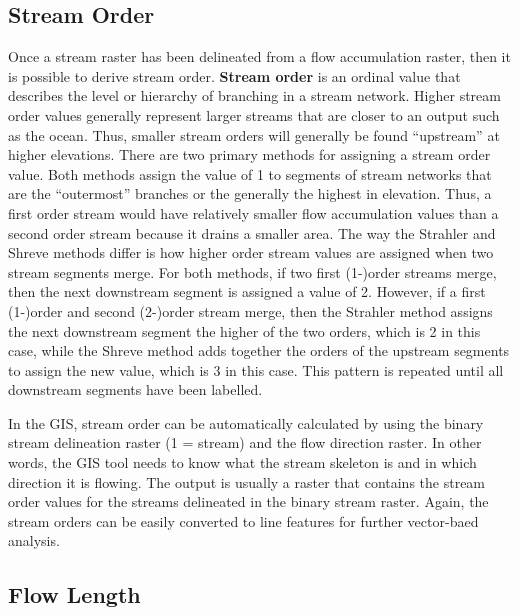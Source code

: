\documentclass[
]{book}
\begin{document}
\subsection{Stream Order}\label{stream-order}

Once a stream raster has been delineated from a flow accumulation raster, then it is possible to derive stream order. \textbf{Stream order} is an ordinal value that describes the level or hierarchy of branching in a stream network. Higher stream order values generally represent larger streams that are closer to an output such as the ocean. Thus, smaller stream orders will generally be found ``upstream'' at higher elevations. There are two primary methods for assigning a stream order value. Both methods assign the value of 1 to segments of stream networks that are the ``outermost'' branches or the generally the highest in elevation. Thus, a first order stream would have relatively smaller flow accumulation values than a second order stream because it drains a smaller area. The way the Strahler \citep{strahler_quantitative_1957} and Shreve \citep{shreve_statistical_1966} methods differ is how higher order stream values are assigned when two stream segments merge. For both methods, if two first (1-)order streams merge, then the next downstream segment is assigned a value of 2. However, if a first (1-)order and second (2-)order stream merge, then the Strahler method assigns the next downstream segment the higher of the two orders, which is 2 in this case, while the Shreve method adds together the orders of the upstream segments to assign the new value, which is 3 in this case. This pattern is repeated until all downstream segments have been labelled.

In the GIS, stream order can be automatically calculated by using the binary stream delineation raster (1 = stream) and the flow direction raster. In other words, the GIS tool needs to know what the stream skeleton is and in which direction it is flowing. The output is usually a raster that contains the stream order values for the streams delineated in the binary stream raster. Again, the stream orders can be easily converted to line features for further vector-baed analysis.

\subsection{Flow Length}\label{flow-length}
\end{document}
